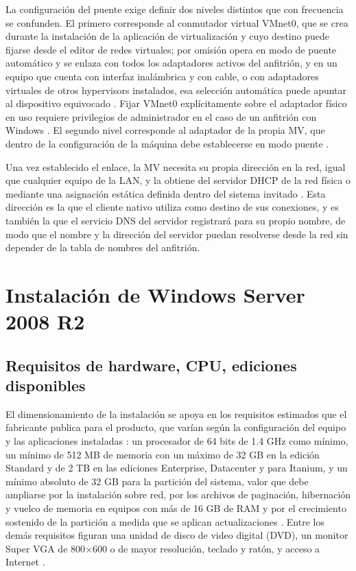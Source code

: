\documentclass[12pt]{article}
\begin{document}
La configuración del puente exige definir dos niveles distintos que con frecuencia se confunden. El primero corresponde al conmutador virtual VMnet0, que se crea durante la instalación de la aplicación de virtualización y cuyo destino puede fijarse desde el editor de redes virtuales; por omisión opera en modo de puente automático y se enlaza con todos los adaptadores activos del anfitrión, y en un equipo que cuenta con interfaz inalámbrica y con cable, o con adaptadores virtuales de otros hypervisors instalados, esa selección automática puede apuntar al dispositivo equivocado \parencite[p.\ 152]{vmwareWorkstationPro26h1}. Fijar VMnet0 explícitamente sobre el adaptador físico en uso requiere privilegios de administrador en el caso de un anfitrión con Windows \parencite[p.\ 151]{vmwareWorkstationPro26h1}. El segundo nivel corresponde al adaptador de la propia MV, que dentro de la configuración de la máquina debe establecerse en modo puente \parencite[p.\ 149]{vmwareWorkstationPro26h1}.

Una vez establecido el enlace, la MV necesita su propia dirección en la red, igual que cualquier equipo de la LAN, y la obtiene del servidor DHCP de la red física o mediante una asignación estática definida dentro del sistema invitado \parencite[p.\ 151]{vmwareWorkstationPro26h1}. Esta dirección es la que el cliente nativo utiliza como destino de sus conexiones, y es también la que el servicio DNS del servidor registrará para su propio nombre, de modo que el nombre y la dirección del servidor puedan resolverse desde la red sin depender de la tabla de nombres del anfitrión.

\section{Instalación de Windows Server 2008 R2}
\label{sec:instalacionWindowsServer}

\subsection{Requisitos de hardware, CPU, ediciones disponibles}
\label{sec:requisitosHardware}

El dimensionamiento de la instalación se apoya en los requisitos estimados que el fabricante publica para el producto, que varían según la configuración del equipo y las aplicaciones instaladas \parencite{microsoftInstallWs2008r2}: un procesador de 64 bits de 1.4 GHz como mínimo, un mínimo de 512 MB de memoria con un máximo de 32 GB en la edición Standard y de 2 TB en las ediciones Enterprise, Datacenter y para Itanium, y un mínimo absoluto de 32 GB para la partición del sistema, valor que debe ampliarse por la instalación sobre red, por los archivos de paginación, hibernación y vuelco de memoria en equipos con más de 16 GB de RAM y por el crecimiento sostenido de la partición a medida que se aplican actualizaciones \parencite{microsoftInstallWs2008r2}. Entre los demás requisitos figuran una unidad de disco de video digital (DVD), un monitor Super VGA de 800$\times$600 o de mayor resolución, teclado y ratón, y acceso a Internet \parencite{microsoftInstallWs2008r2}.
\end{document}
